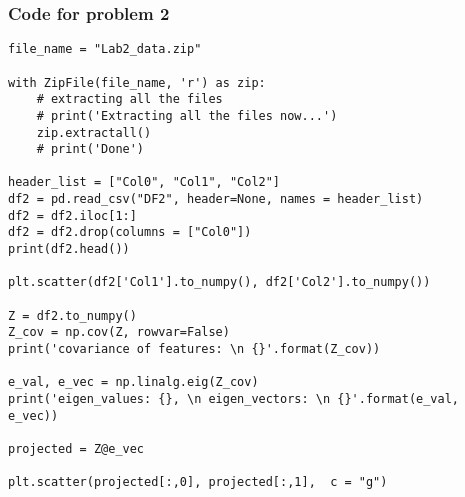 \documentclass[12pt]{article}%
\begin{document}
\subsubsection*{Code for problem 2}
\begin{lstlisting}
file_name = "Lab2_data.zip"

with ZipFile(file_name, 'r') as zip: 
    # extracting all the files 
    # print('Extracting all the files now...') 
    zip.extractall() 
    # print('Done')
    
header_list = ["Col0", "Col1", "Col2"]
df2 = pd.read_csv("DF2", header=None, names = header_list)
df2 = df2.iloc[1:]
df2 = df2.drop(columns = ["Col0"])
print(df2.head())

plt.scatter(df2['Col1'].to_numpy(), df2['Col2'].to_numpy())

Z = df2.to_numpy()
Z_cov = np.cov(Z, rowvar=False)
print('covariance of features: \n {}'.format(Z_cov))

e_val, e_vec = np.linalg.eig(Z_cov)
print('eigen_values: {}, \n eigen_vectors: \n {}'.format(e_val, e_vec))

projected = Z@e_vec

plt.scatter(projected[:,0], projected[:,1],  c = "g")
\end{lstlisting}
\end{document}

